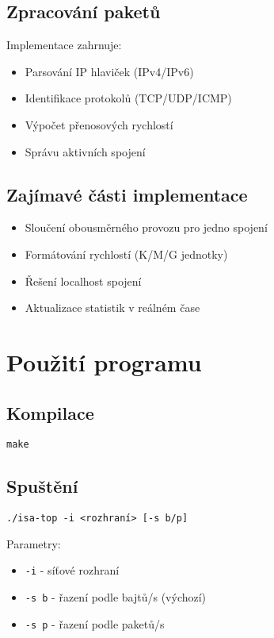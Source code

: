 \documentclass[a4paper,11pt]{article}
\theoremstyle{definition}
\begin{document}
\subsection{Zpracování paketů}
Implementace zahrnuje:
\begin{itemize}
    \item Parsování IP hlaviček (IPv4/IPv6)
    \item Identifikace protokolů (TCP/UDP/ICMP)
    \item Výpočet přenosových rychlostí
    \item Správu aktivních spojení
\end{itemize}

\subsection{Zajímavé části implementace}
\begin{itemize}
    \item Sloučení obousměrného provozu pro jedno spojení
    \item Formátování rychlostí (K/M/G jednotky)
    \item Řešení localhost spojení
    \item Aktualizace statistik v reálném čase
\end{itemize}

\section{Použití programu}
\subsection{Kompilace}
\begin{verbatim}
make
\end{verbatim}

\subsection{Spuštění}
\begin{verbatim}
./isa-top -i <rozhraní> [-s b/p]
\end{verbatim}

Parametry:
\begin{itemize}
    \item \texttt{-i} - síťové rozhraní
    \item \texttt{-s b} - řazení podle bajtů/s (výchozí)
    \item \texttt{-s p} - řazení podle paketů/s
\end{itemize}
\end{document}
